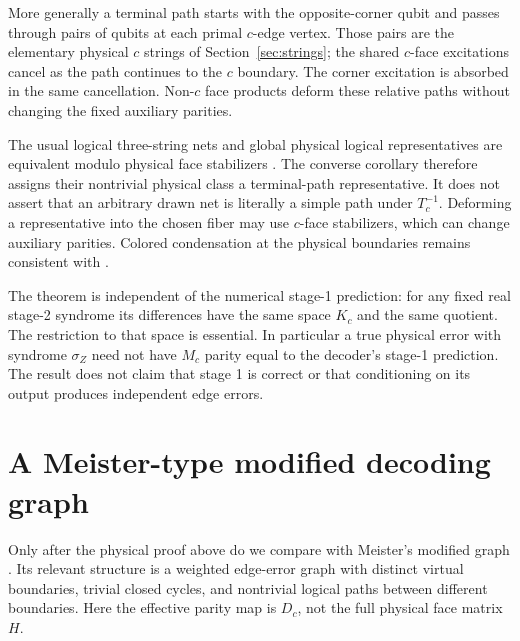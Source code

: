 \documentclass[11pt]{article}
\theoremstyle{definition}
\theoremstyle{plain}
\theoremstyle{remark}
\begin{document}
More generally a terminal path starts with the opposite-corner qubit
and passes through pairs of qubits at each primal $c$-edge vertex.
Those pairs are the elementary physical $c$ strings of
Section~\ref{sec:strings}; the shared $c$-face excitations cancel as the
path continues to the $c$ boundary. The corner excitation is absorbed
in the same cancellation. Non-$c$ face products deform these relative
paths without changing the fixed auxiliary parities.

The usual logical three-string nets and global physical logical
representatives are equivalent modulo physical face stabilizers
\cite[pp.~2--3, Eqs.~(4)--(6) and Fig.~3]{Bombin}.
The converse corollary therefore assigns their nontrivial physical
class a terminal-path representative. It does not assert that an
arbitrary drawn net is literally a simple path under $T_c^{-1}$.
Deforming a representative into the chosen fiber may use $c$-face
stabilizers, which can change auxiliary parities.
Colored condensation at the physical boundaries remains consistent
with \cite[Secs.~4.2--4.3]{Kesselring}.

The theorem is independent of the numerical stage-1 prediction:
for any fixed real stage-2 syndrome its differences have the same
space $K_c$ and the same quotient. The restriction to that space is
essential. In particular a true physical error with syndrome $\sigma_Z$
need not have $M_c$ parity equal to the decoder's stage-1 prediction.
The result does not claim that stage 1 is correct or that conditioning
on its output produces independent edge errors.

\section{A Meister-type modified decoding graph}
\label{sec:meistergraph}
Only after the physical proof above do we compare with Meister's
modified graph \cite[Sec.~II.B.1, pp.~2--3]{Meister}.
Its relevant structure is a weighted edge-error graph with distinct
virtual boundaries, trivial closed cycles, and nontrivial logical
paths between different boundaries. Here the effective parity map
is $D_c$, not the full physical face matrix $H$.
\end{document}
